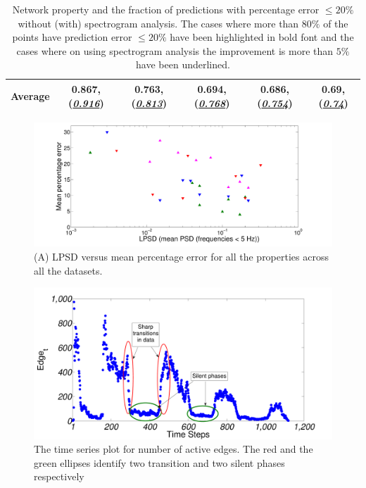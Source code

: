 \begin{table}
\begin{adjustbox}{max width=\textwidth}
\begin{tabular}{|c|c|c|c|c|c|}
\hline
Average                                                           & 0.867, (\underline{\it 0.916})                                                  & 0.763, (\underline{\it 0.813})                                                   & 0.694, (\underline{\it 0.768})                                                     & 0.686, (\underline{\it 0.754})                                                     & 0.69, (\underline{\it 0.74})    \\ \hline
\end{tabular}
\end{adjustbox}
 \caption{\label{tab_res}Network property and the fraction of predictions with percentage error  $\leq20\%$ without (with) spectrogram analysis. 
 The cases where more than $80\%$ of the points have prediction error $\leq 20\%$ have been highlighted in bold font and the cases where on using spectrogram analysis 
 the improvement is more than $5\%$ have been underlined.}

\end{table}
\begin{figure}
 \begin{center}
 \includegraphics[width=0.89\columnwidth, angle=0]{./texfiles/Chapter_1/fig/psd_pred-eps-converted-to.pdf}
 \caption{\label{k1}(A) LPSD versus mean percentage error for all the properties across all the datasets.}
  \end{center}
 \end{figure}


 \begin{figure}[!ht]
  \begin{center}
  \includegraphics[width=0.7\columnwidth, angle=0]{./texfiles/Chapter_1/fig/no_of_edges1-eps-converted-to.pdf}
  \caption{\label{fig9}The time series plot for number of active edges. The red and the green ellipses identify
  two transition and two silent phases respectively}
  \end{center}
 \end{figure}

